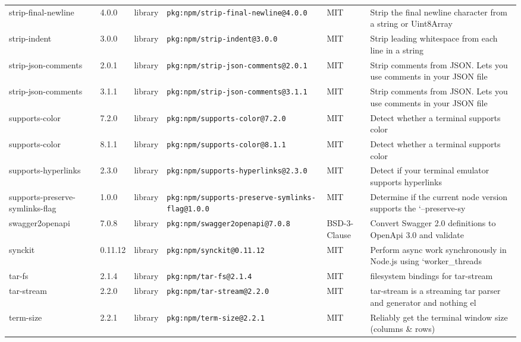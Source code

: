\documentclass[11pt,a4paper]{article}
\begin{document}
\begin{longtable}{|p{4cm}|p{2cm}|p{1.6cm}|p{5cm}|p{1.5cm}|p{3.5cm}|}
\raggedright strip-final-newline & 4.0.0 & library & \small\texttt{pkg:npm/strip-final-newline@4.0.0} & MIT & \small Strip the final newline character from a string or Uint8Array \\
\raggedright strip-indent & 3.0.0 & library & \small\texttt{pkg:npm/strip-indent@3.0.0} & MIT & \small Strip leading whitespace from each line in a string \\
\raggedright strip-json-comments & 2.0.1 & library & \small\texttt{pkg:npm/strip-json-comments@2.0.1} & MIT & \small Strip comments from JSON. Lets you use comments in your JSON file \\
\raggedright strip-json-comments & 3.1.1 & library & \small\texttt{pkg:npm/strip-json-comments@3.1.1} & MIT & \small Strip comments from JSON. Lets you use comments in your JSON file \\
\raggedright supports-color & 7.2.0 & library & \small\texttt{pkg:npm/supports-color@7.2.0} & MIT & \small Detect whether a terminal supports color \\
\raggedright supports-color & 8.1.1 & library & \small\texttt{pkg:npm/supports-color@8.1.1} & MIT & \small Detect whether a terminal supports color \\
\raggedright supports-hyperlinks & 2.3.0 & library & \small\texttt{pkg:npm/supports-hyperlinks@2.3.0} & MIT & \small Detect if your terminal emulator supports hyperlinks \\
\raggedright supports-preserve-symlinks-flag & 1.0.0 & library & \small\texttt{pkg:npm/supports-preserve-symlinks-flag@1.0.0} & MIT & \small Determine if the current node version supports the `--preserve-sy \\
\raggedright swagger2openapi & 7.0.8 & library & \small\texttt{pkg:npm/swagger2openapi@7.0.8} & BSD-3-Clause & \small Convert Swagger 2.0 definitions to OpenApi 3.0 and validate \\
\raggedright synckit & 0.11.12 & library & \small\texttt{pkg:npm/synckit@0.11.12} & MIT & \small Perform async work synchronously in Node.js using `worker\_threads \\
\raggedright tar-fs & 2.1.4 & library & \small\texttt{pkg:npm/tar-fs@2.1.4} & MIT & \small filesystem bindings for tar-stream \\
\raggedright tar-stream & 2.2.0 & library & \small\texttt{pkg:npm/tar-stream@2.2.0} & MIT & \small tar-stream is a streaming tar parser and generator and nothing el \\
\raggedright term-size & 2.2.1 & library & \small\texttt{pkg:npm/term-size@2.2.1} & MIT & \small Reliably get the terminal window size (columns \& rows) \\

\end{longtable}
\end{document}
